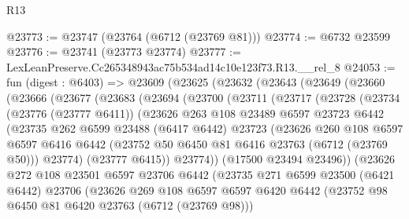 \begin{lexlean}{R13}
\begin{coremodule}
@23773 := @23747 (@23764 (@6712 (@23769 @81)))
@23774 := @6732 @23599
@23776 := @23741 (@23773 @23774)
@23777 := LexLeanPreserve.Cc265348943ac75b534ad14c10e123f73.R13.__rel_8
@24053 := fun (digest : @6403) =>
  @23609
    (@23625
      (@23632
        (@23643
          (@23649
            (@23660
              (@23666
                (@23677
                  (@23683
                    (@23694
                      (@23700
                        (@23711
                          (@23717
                            (@23728
                              (@23734
                                (@23776 (@23777 @6411))
                                (@23626
                                  @263
                                  @108
                                  @23489
                                  @6597
                                  @23723
                                  @6442
                                  (@23735
                                    @262
                                    @6599
                                    @23488
                                    (@6417 @6442)
                                    @23723
                                    (@23626
                                      @260
                                      @108
                                      @6597
                                      @6597
                                      @6416
                                      @6442
                                      (@23752 @50 @6450 @81 @6416 @23763 (@6712 (@23769 @50)))
                                      @23774)
                                    (@23777 @6415))
                                  @23774))
                              (@17500 @23494 @23496))
                            (@23626
                              @272
                              @108
                              @23501
                              @6597
                              @23706
                              @6442
                              (@23735
                                @271
                                @6599
                                @23500
                                (@6421 @6442)
                                @23706
                                (@23626
                                  @269
                                  @108
                                  @6597
                                  @6597
                                  @6420
                                  @6442
                                  (@23752 @98 @6450 @81 @6420 @23763 (@6712 (@23769 @98)))

\end{coremodule}
\end{lexlean}
